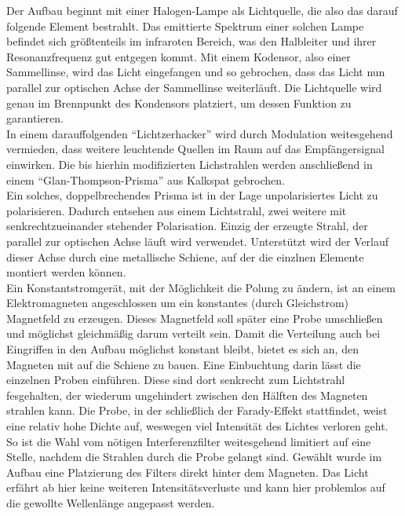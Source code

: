 Der Aufbau beginnt mit einer Halogen-Lampe als Lichtquelle, die also das darauf folgende Element bestrahlt. Das 
emittierte Spektrum einer solchen Lampe befindet sich größtenteils im infraroten Bereich, was den Halbleiter und ihrer 
Resonanzfrequenz gut entgegen kommt. Mit einem Kodensor, also einer Sammellinse, wird das Licht eingefangen und so gebrochen, 
dass das Licht nun parallel zur optischen Achse der Sammellinse weiterläuft. 
Die Lichtquelle wird genau im Brennpunkt des Kondensors platziert, um dessen Funktion zu garantieren.
\\
\newline
In einem darauffolgenden \enquote{Lichtzerhacker} wird durch Modulation weitesgehend vermieden, dass weitere leuchtende Quellen im Raum
auf das Empfängersignal einwirken. Die bis hierhin modifizierten Lichstrahlen werden anschließend in einem
\enquote{Glan-Thompson-Prisma} aus Kalkspat gebrochen. \\
Ein solches, doppelbrechendes Prisma ist in der Lage unpolarisiertes Licht zu polarisieren. Dadurch entsehen 
aus einem Lichtstrahl, zwei weitere mit senkrechtzueinander stehender Polarisation. Einzig der erzeugte Strahl, 
der parallel zur optischen Achse läuft wird verwendet. Unterstützt wird der Verlauf dieser Achse durch eine metallische Schiene,
auf der die einzlnen Elemente montiert werden können.
\\
\newline
Ein Konstantstromgerät, mit der Möglichkeit die Polung zu ändern, ist an einem Elektromagneten angeschlossen um ein konstantes (durch Gleichstrom) Magnetfeld
zu erzeugen. Dieses Magnetfeld soll später eine Probe umschließen und möglichst gleichmäßig darum verteilt sein. Damit die Verteilung 
auch bei Eingriffen in den Aufbau möglichst konstant bleibt, bietet es sich an, den Magneten mit auf die Schiene zu bauen. Eine Einbuchtung 
darin lässt die einzelnen Proben einführen. Diese sind dort senkrecht zum Lichtstrahl fesgehalten, der wiederum ungehindert zwischen den Hälften des Magneten 
strahlen kann. Die Probe, in der schließlich der Farady-Effekt stattfindet, weist eine relativ hohe Dichte auf, weswegen viel Intensität des Lichtes verloren geht. 
So ist die Wahl vom nötigen Interferenzfilter weitesgehend limitiert auf eine Stelle, nachdem die Strahlen durch die Probe gelangt sind. 
Gewählt wurde im Aufbau eine Platzierung des Filters direkt hinter dem Magneten. Das Licht erfährt ab hier keine weiteren Intensitätsverluste und kann hier problemlos
auf die gewollte Wellenlänge angepasst werden.
\\

